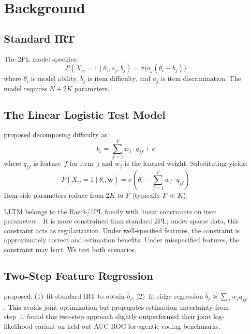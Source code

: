 \documentclass[11pt,a4paper]{article}
\begin{document}
\section{Background}
\label{sec:background}

\subsection{Standard IRT}

The 2PL model specifies:
\begin{equation}
P(X_{ij} = 1 \mid \theta_i, a_j, b_j) = \sigma\bigl(a_j(\theta_i - b_j)\bigr)
\end{equation}
where $\theta_i$ is model ability, $b_j$ is item difficulty, and $a_j$
is item discrimination. The model requires $N + 2K$ parameters.

\subsection{The Linear Logistic Test Model}

\citet{fischer1973} proposed decomposing difficulty as:
\begin{equation}
b_j = \sum_{f=1}^{F} w_f \cdot q_{jf} + c
\end{equation}
where $q_{jf}$ is feature~$f$ for item~$j$ and $w_f$ is the learned
weight. Substituting yields:
\begin{equation}
P(X_{ij} = 1 \mid \theta_i, \mathbf{w}) = \sigma\!\left(\theta_i - \sum_{f=1}^{F} w_f \cdot q_{jf}\right)
\label{eq:lltm}
\end{equation}
Item-side parameters reduce from $2K$ to $F$ (typically $F \ll K$).

LLTM belongs to the Rasch/1PL family with linear constraints on item
parameters \citep{fischer1973}. It is more constrained than standard 2PL;
under sparse data, this constraint acts as regularization. Under
well-specified features, the constraint is approximately correct and
estimation benefits. Under misspecified features, the constraint may hurt.
We test both scenarios.

\subsection{Two-Step Feature Regression}

\citet{ge2026agent} proposed: (1)~fit standard IRT to obtain
$\hat{b}_j$; (2)~fit ridge regression
$\hat{b}_j \approx \sum_f w_f q_{jf}$. This avoids joint optimization
but propagates estimation uncertainty from step~1.
\citet{ge2026agent} found this two-step approach slightly outperformed
their joint log-likelihood variant on held-out AUC-ROC for agentic coding
benchmarks.
\end{document}

